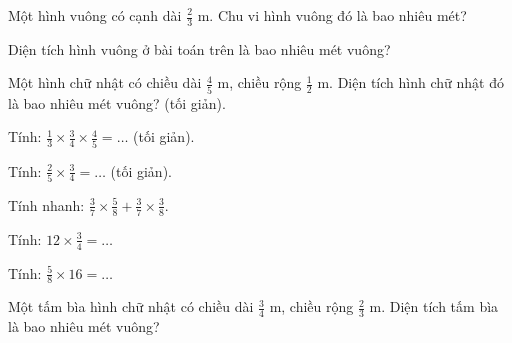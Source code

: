 \begin{ex}
Một hình vuông có cạnh dài $\frac{2}{3}$ m. Chu vi hình vuông đó là bao nhiêu mét?
\end{ex}

\begin{ex}
Diện tích hình vuông ở bài toán trên là bao nhiêu mét vuông?
\end{ex}

\begin{ex}
Một hình chữ nhật có chiều dài $\frac{4}{5}$ m, chiều rộng $\frac{1}{2}$ m. Diện tích hình chữ nhật đó là bao nhiêu mét vuông? (tối giản).
\end{ex}

\begin{ex}
Tính: $\frac{1}{3} \times \frac{3}{4} \times \frac{4}{5} = \dots$ (tối giản).
\end{ex}

\begin{ex}
Tính: $\frac{2}{5} \times \frac{3}{4} = \dots$ (tối giản).
\end{ex}

\begin{ex}
Tính nhanh: $\frac{3}{7} \times \frac{5}{8} + \frac{3}{7} \times \frac{3}{8}$.
\end{ex}

\begin{ex}
Tính: $12 \times \frac{3}{4} = \dots$
\end{ex}

\begin{ex}
Tính: $\frac{5}{8} \times 16 = \dots$
\end{ex}

\begin{ex}
Một tấm bìa hình chữ nhật có chiều dài $\frac{3}{4}$ m, chiều rộng $\frac{2}{3}$ m. Diện tích tấm bìa là bao nhiêu mét vuông?
\end{ex}

